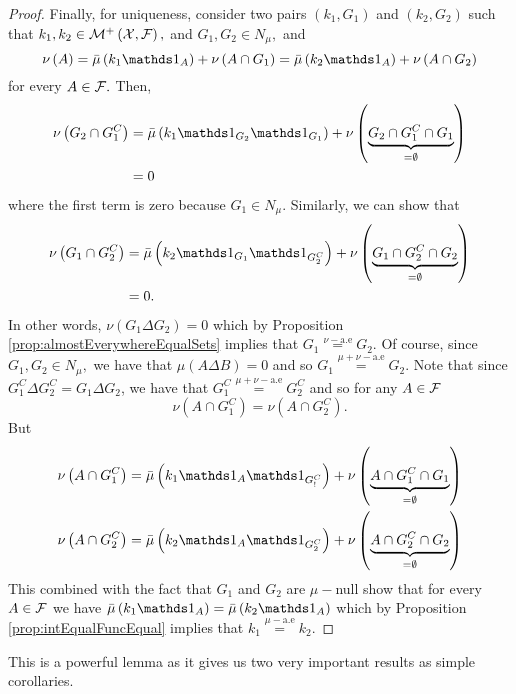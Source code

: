 \begin{proof}
Finally, for uniqueness, consider two pairs $\left(k_{1},G_{1}\right)$
and $\left(k_{2},G_{2}\right)$ such that $k_{1},k_{2}\in\mathcal{M}^{+}\left(\mathcal{X},\mathcal{F}\right),$
and $G_{1},G_{2}\in N_{\mu},$ and
\[
\nu\left(A\right)=\lebInt{\mu}{k_{1}\indicate_{A}}+\nu\left(A\cap G_{1}\right)=\lebInt{\mu}{k_{2}\indicate_{A}}+\nu\left(A\cap G_{2}\right)
\]
for every $A\in\mathcal{F}.$ Then,
\begin{align*}
\nu\left(G_{2}\cap G_{1}^{C}\right) & =\lebInt{\mu}{k_{1}\indicate_{G_{2}}\indicate_{G_{1}}}+\nu\left(\underbrace{G_{2}\cap G_{1}^{C}\cap G_{1}}_{=\emptyset}\right)\\
 & =0
\end{align*}
where the first term is zero because $G_{1}\in N_{\mu}.$ Similarly,
we can show that 
\begin{align*}
\nu\left(G_{1}\cap G_{2}^{C}\right) & =\lebInt{\mu}{k_{2}\indicate_{G_{1}}\indicate_{G_{2}^{C}}}+\nu\left(\underbrace{G_{1}\cap G_{2}^{C}\cap G_{2}}_{=\emptyset}\right)\\
 & =0.
\end{align*}
In other words, $\nu\left(G_{1}\Delta G_{2}\right)=0$ which by Proposition
\ref{prop:almostEverywhereEqualSets} implies that $G_{1}\stackrel{\nu-\text{a.e}}{=}G_{2}.$
Of course, since $G_{1},G_{2}\in N_{\mu},$ we have that $\mu\left(A\Delta B\right)=0$
and so $G_{1}\stackrel{\mu+\nu-\text{a.e}}{=}G_{2}.$ Note that since
$G_{1}^{C}\Delta G_{2}^{C}=G_{1}\Delta G_{2}$, we have that $G_{1}^{C}\stackrel{\mu+\nu-\text{a.e}}{=}G_{2}^{C}$
and so for any $A\in\mathcal{F}$
\[
\nu\left(A\cap G_{1}^{C}\right)=\nu\left(A\cap G_{2}^{C}\right).
\]
But
\begin{align*}
\nu\left(A\cap G_{1}^{C}\right) & =\lebInt{\mu}{k_{1}\indicate_{A}\indicate_{G_{!}^{C}}}+\nu\left(\underbrace{A\cap G_{1}^{C}\cap G_{1}}_{=\emptyset}\right)\\
\nu\left(A\cap G_{2}^{C}\right) & =\lebInt{\mu}{k_{2}\indicate_{A}\indicate_{G_{2}^{C}}}+\nu\left(\underbrace{A\cap G_{2}^{C}\cap G_{2}}_{=\emptyset}\right)
\end{align*}
This combined with the fact that $G_{1}$ and $G_{2}$ are $\mu-$null
show that for every $A\in\mathcal{F}$ we have $\lebInt{\mu}{k_{1}\indicate_{A}}=\lebInt{\mu}{k_{2}\indicate_{A}}$
which by Proposition \ref{prop:intEqualFuncEqual} implies that $k_{1}\stackrel{\mu-\text{a.e}}{=}k_{2}.$
\end{proof}
This is a powerful lemma as it gives us two very important results
as simple corollaries.
